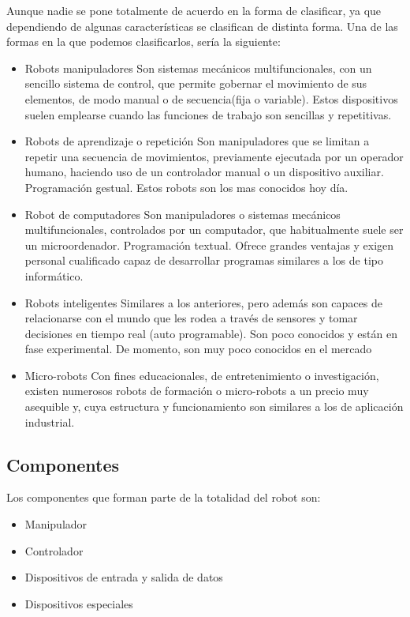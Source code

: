 \documentclass[12pt,a4paper]{report}
\begin{document}
Aunque nadie se pone totalmente de acuerdo en la forma de clasificar, ya que
dependiendo de algunas características se clasifican de distinta forma. Una de
las formas en la que podemos clasificarlos, sería la siguiente: 
\begin{itemize}
    \item Robots manipuladores
    Son sistemas mecánicos multifuncionales, con un sencillo sistema de control,
    que permite gobernar el movimiento de sus elementos, de modo manual o de
    secuencia(fija o variable).  Estos dispositivos suelen emplearse cuando las
    funciones de trabajo son sencillas y repetitivas.
    \item Robots de aprendizaje o repetición
    Son manipuladores que se limitan a repetir una secuencia de movimientos,
    previamente ejecutada por un operador humano, haciendo uso de un
    controlador manual o un dispositivo auxiliar. Programación gestual. 
    Estos robots son los mas conocidos hoy día.
    \item Robot de computadores
    Son manipuladores o sistemas mecánicos multifuncionales, controlados por un
    computador, que habitualmente suele ser un microordenador. Programación textual. 
    Ofrece grandes ventajas y exigen personal cualificado capaz de desarrollar
    programas similares a los de tipo informático.
    \item Robots inteligentes
    Similares a los anteriores, pero además son capaces de relacionarse con el mundo
    que les rodea a través de sensores y tomar decisiones en tiempo real (auto
    programable).
    Son poco conocidos y están en fase experimental. 
    De momento, son muy poco conocidos en el mercado
    \item Micro-robots
    Con fines educacionales, de entretenimiento o investigación, existen numerosos
    robots de formación o micro-robots a un precio muy asequible y, cuya estructura
    y funcionamiento son similares a los de aplicación industrial.
\end{itemize}


\subsection{Componentes}

Los componentes que forman parte de la totalidad del robot son:

\begin{itemize}
    \item Manipulador
    \item Controlador
    \item Dispositivos de entrada y salida de datos
    \item Dispositivos especiales
\end{itemize}
\end{document}
